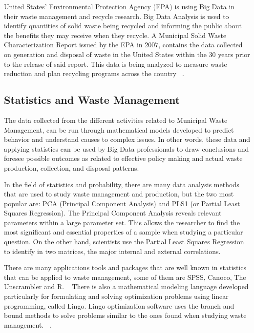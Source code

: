 \documentclass[sigconf]{acmart}
\begin{document}
United States' Environmental Protection Agency (EPA) is using Big Data in their waste management and recycle research. Big Data Analysis is used to identify quantities of solid waste being recycled and informing the public about the benefits they may receive when they recycle. A Municipal Solid Waste Characterization Report issued by the EPA in 2007, contains the data collected on generation and disposal of waste in the United States within the 30 years prior to the release of said report. This data is being analyzed to measure waste reduction and plan recycling programs across the country ~\cite{epaRecycleBenefits2007}.


\subsection{Statistics and Waste Management}

The data collected from the different activities related to Municipal Waste Management, can be run through mathematical models developed to predict behavior and understand causes to complex issues. In other words, these data and applying statistics can be used by Big Data professionals to draw conclusions and foresee possible outcomes as related to effective policy making and actual waste production, collection, and disposal patterns. 

In the field of statistics and probability, there are many data analysis methods that are used to  study waste management and production, but the two most popular are: PCA  (Principal Component Analysis) and PLS1 (or Partial Least Squares Regression).  The Principal Component Analysis  reveals relevant parameters within a large parameter set. This allows the researcher to find the most significant and essential properties of a sample when studying a particular question. On the other hand, scientists use the Partial Least Squares Regression to identify in two matrices, the major internal and external correlations. ~\cite{bohm2013}

There are many applications tools and packages that are well known in statistics that can be applied to waste management, some of them are SPSS, Canoco, The Unscrambler and R. ~\cite{bohm2013}
There is also  a mathematical modeling language developed  particularly for formulating and solving  optimization problems using linear programming, called Lingo. Lingo optimization software uses the branch and bound methods to solve problems similar to the ones found when studying waste management. ~\cite{akbarpour2016}.  
\end{document}
